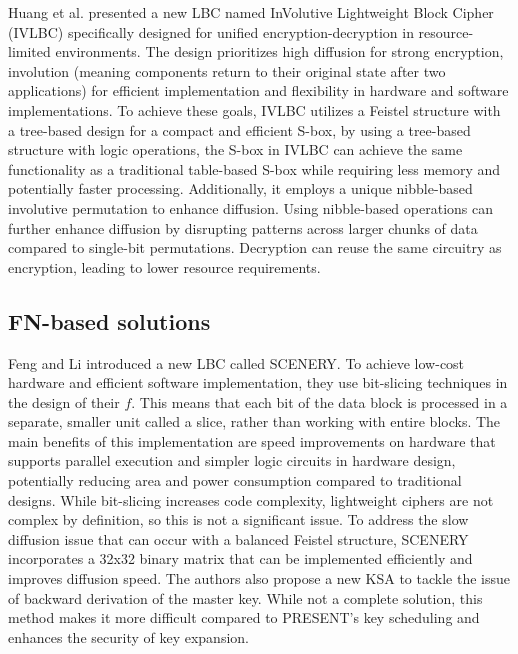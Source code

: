 \documentclass[conference]{IEEEtran}
\begin{document}
Huang et al. presented a new LBC named InVolutive Lightweight Block Cipher (IVLBC) specifically designed for unified encryption-decryption in resource-limited environments. The design prioritizes high diffusion for strong encryption, involution (meaning components return to their original state after two applications) for efficient implementation and flexibility in hardware and software implementations. To achieve these goals, IVLBC utilizes a Feistel structure with a tree-based design for a compact and efficient S-box, by using a tree-based structure with logic operations, the S-box in IVLBC can achieve the same functionality as a traditional table-based S-box while requiring less memory and potentially faster processing. Additionally, it employs a unique nibble-based involutive permutation to enhance diffusion. Using nibble-based operations can further enhance diffusion by disrupting patterns across larger chunks of data compared to single-bit permutations. Decryption can reuse the same circuitry as encryption, leading to lower resource requirements\cite{IVLBC}.

\subsection{FN-based solutions}

Feng and Li introduced a new LBC called SCENERY. To achieve low-cost hardware and efficient software implementation, they use bit-slicing techniques in the design of their $f$. This means that each bit of the data block is processed in a separate, smaller unit called a slice, rather than working with entire blocks. The main benefits of this implementation are speed improvements on hardware that supports parallel execution and simpler logic circuits in hardware design, potentially reducing area and power consumption compared to traditional designs. While bit-slicing increases code complexity, lightweight ciphers are not complex by definition, so this is not a significant issue. To address the slow diffusion issue that can occur with a balanced Feistel structure, SCENERY incorporates a 32x32 binary matrix that can be implemented efficiently and improves diffusion speed. The authors also propose a new KSA to tackle the issue of backward derivation of the master key. While not a complete solution, this method makes it more difficult compared to PRESENT's key scheduling\cite{PRESENT} and enhances the security of key expansion.\cite{SCENERY}
\end{document}
